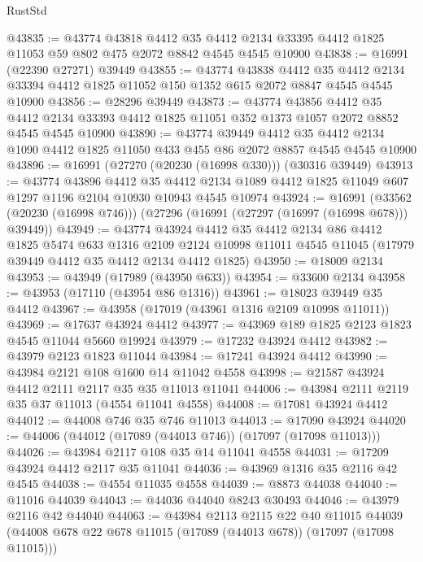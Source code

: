 \begin{lexlean}{RustStd}
\begin{coremodule}
@43835 := @43774
    @43818
    @4412
    @35
    @4412
    @2134
    @33395
    @4412
    @1825
    @11053
    @59
    @802
    @475
    @2072
    @8842
    @4545
    @4545
    @10900
@43838 := @16991 (@22390 @27271) @39449
@43855 := @43774
    @43838
    @4412
    @35
    @4412
    @2134
    @33394
    @4412
    @1825
    @11052
    @150
    @1352
    @615
    @2072
    @8847
    @4545
    @4545
    @10900
@43856 := @28296 @39449
@43873 := @43774
    @43856
    @4412
    @35
    @4412
    @2134
    @33393
    @4412
    @1825
    @11051
    @352
    @1373
    @1057
    @2072
    @8852
    @4545
    @4545
    @10900
@43890 := @43774
    @39449
    @4412
    @35
    @4412
    @2134
    @1090
    @4412
    @1825
    @11050
    @433
    @455
    @86
    @2072
    @8857
    @4545
    @4545
    @10900
@43896 := @16991 (@27270 (@20230 (@16998 @330))) (@30316 @39449)
@43913 := @43774
    @43896
    @4412
    @35
    @4412
    @2134
    @1089
    @4412
    @1825
    @11049
    @607
    @1297
    @1196
    @2104
    @10930
    @10943
    @4545
    @10974
@43924 := @16991
    (@33562 (@20230 (@16998 @746)))
    (@27296 (@16991 (@27297 (@16997 (@16998 @678))) @39449))
@43949 := @43774
    @43924
    @4412
    @35
    @4412
    @2134
    @86
    @4412
    @1825
    @5474
    @633
    @1316
    @2109
    @2124
    @10998
    @11011
    @4545
    @11045
    (@17979 @39449 @4412 @35 @4412 @2134 @4412 @1825)
@43950 := @18009 @2134
@43953 := @43949 (@17989 (@43950 @633))
@43954 := @33600 @2134
@43958 := @43953 (@17110 (@43954 @86 @1316))
@43961 := @18023 @39449 @35 @4412
@43967 := @43958 (@17019 (@43961 @1316 @2109 @10998 @11011))
@43969 := @17637 @43924 @4412
@43977 := @43969 @189 @1825 @2123 @1823 @4545 @11044 @5660 @19924
@43979 := @17232 @43924 @4412
@43982 := @43979 @2123 @1823 @11044
@43984 := @17241 @43924 @4412
@43990 := @43984 @2121 @108 @1600 @14 @11042 @4558
@43998 := @21587 @43924 @4412 @2111 @2117 @35 @35 @11013 @11041
@44006 := @43984 @2111 @2119 @35 @37 @11013 (@4554 @11041 @4558)
@44008 := @17081 @43924 @4412
@44012 := @44008 @746 @35 @746 @11013
@44013 := @17090 @43924
@44020 := @44006 (@44012 (@17089 (@44013 @746)) (@17097 (@17098 @11013)))
@44026 := @43984 @2117 @108 @35 @14 @11041 @4558
@44031 := @17209 @43924 @4412 @2117 @35 @11041
@44036 := @43969 @1316 @35 @2116 @42 @4545
@44038 := @4554 @11035 @4558
@44039 := @8873 @44038
@44040 := @11016 @44039
@44043 := @44036 @44040 @8243 @30493
@44046 := @43979 @2116 @42 @44040
@44063 := @43984
    @2113
    @2115
    @22
    @40
    @11015
    @44039
    (@44008 @678 @22 @678 @11015 (@17089 (@44013 @678)) (@17097 (@17098 @11015)))

\end{coremodule}
\end{lexlean}
